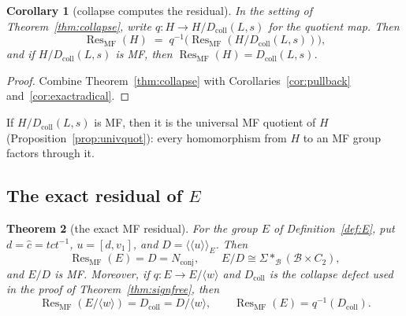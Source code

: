 \documentclass[11pt]{amsart}
\newcommand{\leanverified}[2]{\ignorespaces}
\newtheorem{theorem}{Theorem}[section]
\newtheorem{corollary}[theorem]{Corollary}
\theoremstyle{definition}
\theoremstyle{remark}
\theoremstyle{plain}
\begin{document}
\begin{corollary}[collapse computes the residual]\label{cor:collapsequot}
In the setting of Theorem~\ref{thm:collapse}, write
$q\colon H\to H/D_{\mathrm{coll}}(L,s)$ for the quotient map.  Then
\[
  \operatorname{Res}_{\mathrm{MF}}(H)
  \;=\;
  q^{-1}\bigl(\operatorname{Res}_{\mathrm{MF}}
  (H/D_{\mathrm{coll}}(L,s))\bigr),
\]
and if $H/D_{\mathrm{coll}}(L,s)$ is MF, then
$\operatorname{Res}_{\mathrm{MF}}(H)=D_{\mathrm{coll}}(L,s)$.
\leanverified{Sofic/ManuscriptExactWrappers}{GroupApproximation.ManuscriptExactWrappers.manuscriptCollapseRadicalReduction}
\end{corollary}

\begin{proof}
Combine Theorem~\ref{thm:collapse} with
Corollaries~\ref{cor:pullback} and~\ref{cor:exactradical}.
\end{proof}

If $H/D_{\mathrm{coll}}(L,s)$ is MF, then it is the universal MF
quotient of $H$ (Proposition~\ref{prop:univquot}): every homomorphism
from $H$ to an MF group factors through it.

\subsection{The exact residual of $E$}\label{sec:exact-residual}

\begin{theorem}[the exact MF residual]\label{thm:exact-mf-residual}
For the group $E$ of Definition~\ref{def:E}, put $d=\hat c=tct^{-1}$,
$u=[d,v_1]$, and $D=\langle\!\langle u\rangle\!\rangle_E$.  Then
\[
 \operatorname{Res}_{\mathrm{MF}}(E)=D=N_{\mathrm{conj}},
 \qquad
 E/D\cong \Sigma*_{\mathcal B}(\mathcal B\times C_2),
\]
and $E/D$ is MF\@.  Moreover, if $q\colon E\to E/\langle w\rangle$ and
$D_{\mathrm{coll}}$ is the collapse defect used in the proof of
Theorem~\ref{thm:signfree}, then
\[
 \operatorname{Res}_{\mathrm{MF}}(E/\langle w\rangle)
   =D_{\mathrm{coll}}=D/\langle w\rangle,
 \qquad
 \operatorname{Res}_{\mathrm{MF}}(E)=q^{-1}(D_{\mathrm{coll}}).
\]
\end{theorem}
\end{document}
